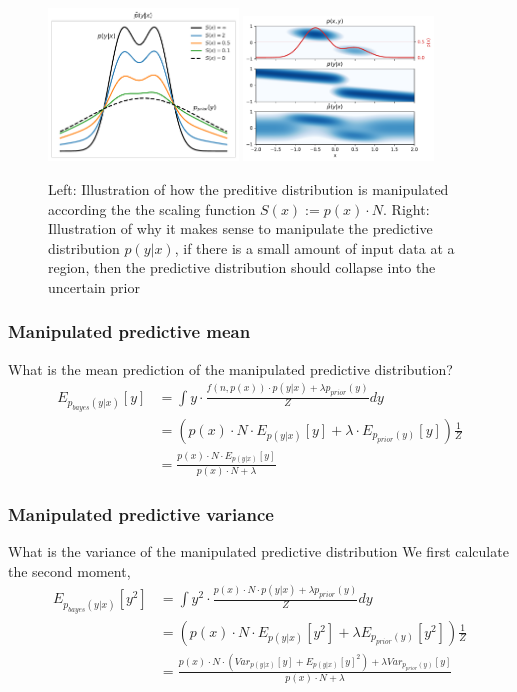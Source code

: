 \begin{figure}[H]
    \centering
    \includegraphics[width=0.45\textwidth]{Pictures/mixture_predictive_bayesian.pdf}
    \includegraphics[width=0.45\textwidth]{Pictures/mixture_predictive_bayesian2D.pdf}
    \caption{Left: Illustration of how the preditive distribution is manipulated according
    the the scaling function $S(x) := p(x)\cdot N$. Right: Illustration of why it makes
    sense to manipulate the predictive distribution $p(y|x)$, if there is a small amount of input data
    at a region, then the predictive distribution should collapse into the uncertain prior}
    \label{pred_dist_manipulation}
\end{figure}

\subsubsection{Manipulated predictive mean}
What is the mean prediction of the manipulated predictive distribution?
\begin{align*}
    E_{p_{bayes}(y|x)}[y] &= \int y \cdot \frac{f(n,p(x)) \cdot p(y|x) + \lambda p_{prior}(y)}{Z} dy\\
    &= \left(p(x)\cdot N \cdot E_{p(y|x)}[y] + \lambda \cdot E_{p_{prior}(y)}[y] \right) \frac{1}{Z}\\
    &= \frac{p(x)\cdot N\cdot E_{p(y|x)}[y]}{p(x)\cdot N+\lambda}
\end{align*}

\subsubsection{Manipulated predictive variance}
What is the variance of the manipulated predictive distribution
We first calculate the second moment, 
\begin{align*}
    E_{p_{bayes}(y|x)}[y^2] &= \int y^2 \cdot \frac{p(x)\cdot N \cdot p(y|x) + \lambda p_{prior}(y)}{Z} dy\\
    &= (p(x)\cdot N\cdot E_{p(y|x)}[y^2] + \lambda E_{p_{prior}(y)}[y^2] ) \frac{1}{Z}\\
    &= \frac{p(x)\cdot N \cdot(Var_{p(y|x)}[y]+E_{p(y|x)}[y]^2) + \lambda Var_{p_{prior}(y)}[y]}{p(x)\cdot N+\lambda}
\end{align*}

